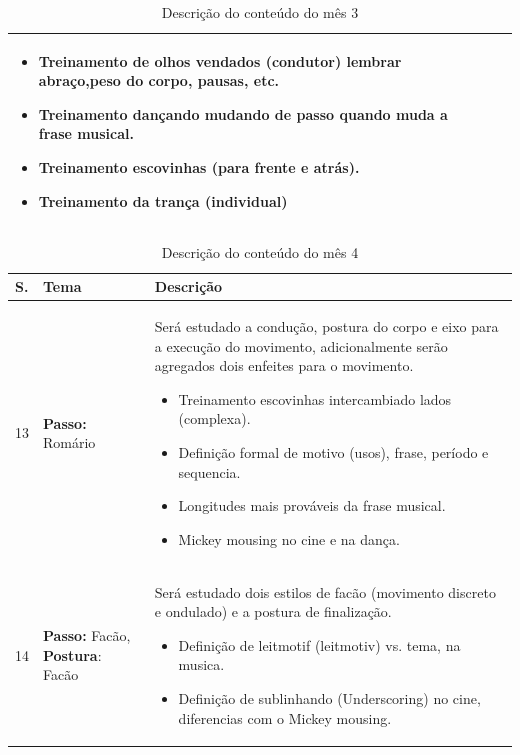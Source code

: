 \documentclass[12pt, a4paper]{article}
\begin{document}
\begin{table}[h]
\begin{tabular}{|p{0.5cm}|p{3.0cm}|p{12.0cm}|}
        \begin{itemize}
        \item Treinamento de olhos vendados (condutor) lembrar abraço,peso do corpo, pausas, etc.
        \item Treinamento dançando mudando de passo quando muda a frase musical.
        \item Treinamento escovinhas (para frente e atrás).
        \item Treinamento da trança (individual)
        \end{itemize}
        \\ \hline
\end{tabular}
\caption{Descrição do conteúdo do mês 3}
\label{tab:myfirsttable3}
\end{table}

\begin{table}[h]
\centering
\begin{tabular}{|p{0.5cm}|p{3.0cm}|p{12.0cm}|}
\hline
S. & Tema & Descrição \\  \hline \hline
13&  \textbf{Passo:} Romário & Será estudado a condução, postura do corpo e eixo para a execução do movimento, adicionalmente serão agregados dois enfeites para o movimento.
        \begin{itemize}
        \item Treinamento escovinhas intercambiado lados (complexa).
        \item Definição formal de motivo (usos), frase, período e sequencia.
        \item Longitudes mais prováveis da frase musical.
        \item Mickey mousing no cine e na dança.
        \end{itemize}
        \\ \hline
14&  \textbf{Passo:} Facão, \textbf{Postura}: Facão & Será estudado dois estilos de facão (movimento discreto e ondulado) e a postura de finalização. 
        \begin{itemize}
        \item Definição de leitmotif (leitmotiv) vs. tema, na musica.
        \item Definição de sublinhando (Underscoring) no cine, diferencias com o Mickey mousing.
        \end{itemize}
        \\ \hline
\end{tabular}
\caption{Descrição do conteúdo do mês 4}
\label{tab:myfirsttable3}
\end{table}
\end{document}
